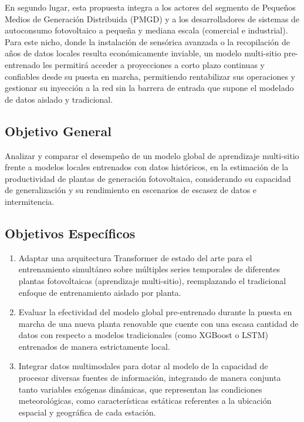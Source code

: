 En segundo lugar, esta propuesta integra a los actores del segmento de Pequeños Medios de Generación Distribuida (PMGD) y a los desarrolladores de sistemas de autoconsumo fotovoltaico a pequeña y mediana escala (comercial e industrial). Para este nicho, donde la instalación de sensórica avanzada o la recopilación de años de datos locales resulta económicamente inviable, un modelo multi-sitio pre-entrenado les permitirá acceder a proyecciones a corto plazo continuas y confiables desde su puesta en marcha, permitiendo rentabilizar sus operaciones y gestionar su inyección a la red sin la barrera de entrada que supone el modelado de datos aislado y tradicional.

\subsection{Objetivo General}
Analizar y comparar el desempeño de un modelo global de aprendizaje multi-sitio frente a modelos locales entrenados con datos históricos, en la estimación de la productividad de plantas de generación fotovoltaica, considerando su capacidad de generalización y su rendimiento en escenarios de escasez de datos e intermitencia.

\subsection{Objetivos Específicos}
\begin{enumerate}
    \item Adaptar una arquitectura Transformer de estado del arte para el entrenamiento simultáneo sobre múltiples series temporales de diferentes plantas fotovoltaicas (aprendizaje multi-sitio), reemplazando el tradicional enfoque de entrenamiento aislado por planta.
    \item Evaluar la efectividad del modelo global pre-entrenado durante la puesta en marcha de una nueva planta renovable que cuente con una escasa cantidad de datos con respecto a modelos tradicionales (como XGBoost o LSTM) entrenados de manera estrictamente local.
    \item Integrar datos multimodales para dotar al modelo de la capacidad de procesar diversas fuentes de información, integrando de manera conjunta tanto variables exógenas dinámicas, que representan las condiciones meteorológicas, como características estáticas referentes a la ubicación espacial y geográfica de cada estación.
\end{enumerate}

